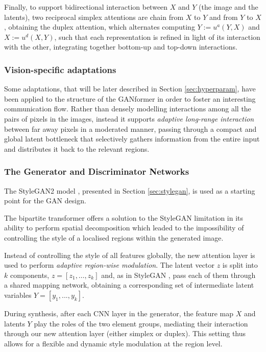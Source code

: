 \documentclass{article}
\begin{document}
	Finally, to support bidirectional interaction between $X$ and $Y$ (the image and the latents), two 
	reciprocal simplex attentions are chain from $X$ to $Y$ and from $Y$ to $X$, obtaining the duplex 
	attention, which alternates computing $Y :=u^a(Y,X)$ and $X:=u^d(X,Y)$, such that each 
	representation is refined in light of its interaction with the other, integrating together bottom-up and 
	top-down interactions.
	
	\subsubsection{Vision-specific adaptations}%
	Some adaptations, that will be later described in Section \ref{sec:hyperparam}, have been applied to 
	the structure of the GANformer in order to foster an interesting communication flow. Rather than 
	densely modelling interactions among all the pairs of pixels in the images, instead it supports 
	\textit{adaptive long-range interaction} between far away pixels in a moderated manner, passing 
	through a compact and global latent bottleneck that selectively gathers information from the entire 
	input and distributes it back to the relevant regions. 
	
	\subsubsection{The Generator and Discriminator Networks}
	The StyleGAN2 model \cite{karras2019style, karras2020analyzing}, presented in Section 
	\ref{sec:stylegan}, is used as a starting point for the GAN design. 
		
	The bipartite transformer offers a solution to the StyleGAN limitation in its ability to perform spatial 
	decomposition which leaded to the impossibility of controlling the style of a localised regions within 
	the generated image.
	
	Instead of controlling the style of all features globally, the new attention layer is used to perform 
	\textit{adaptive region-wise modulation}. The latent vector $z$ is split into $k$ components, $z = 
	[z_1 , \dots, z_k ]$ and, as in StyleGAN \cite{karras2019style}, pass each of them through a shared 
	mapping network, obtaining a corresponding set of intermediate latent variables $Y = [y_1 , ..., y_k 
	]$. 
	
	During synthesis, after each CNN layer in the generator, the feature map $X$ and latents $Y$ play 
	the roles of the two element groups, mediating their interaction through our new attention layer 
	(either simplex or duplex). 
	This setting thus allows for a flexible and dynamic style modulation at the region level. 
	
\end{document}
